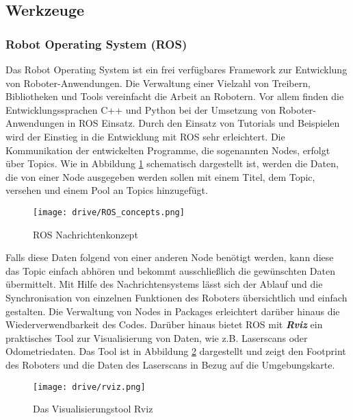 \subsection{Werkzeuge}

\subsubsection{Robot Operating System (ROS)}

Das Robot Operating System ist ein frei verfügbares Framework zur Entwicklung von Roboter-Anwendungen. Die Verwaltung einer Vielzahl von Treibern, Bibliotheken und Tools vereinfacht die Arbeit an Robotern. Vor allem finden die Entwicklungssprachen C++ und Python bei der Umsetzung von Roboter-Anwendungen in ROS Einsatz. Durch den Einsatz von Tutorials und Beispielen wird der Einstieg in die Entwicklung mit ROS sehr erleichtert. Die Kommunikation der entwickelten Programme, die sogenannten Nodes, erfolgt über Topics. Wie in Abbildung \ref{fig:ROS_concepts} schematisch dargestellt ist, werden die Daten, die von einer Node
ausgegeben werden sollen mit einem Titel, dem Topic, versehen und einem Pool an Topics hinzugefügt.

\begin{figure}[h!]
 \centering
		\texttt{[image: drive/ROS\_concepts.png]}
	\caption{ROS Nachrichtenkonzept}
	\label{fig:ROS_concepts}
\end{figure}

Falls diese Daten folgend von einer anderen Node benötigt werden, kann diese das Topic einfach abhören und bekommt ausschließlich die gewünschten Daten übermittelt. Mit Hilfe des Nachrichtensystems lässt sich der Ablauf und die Synchronisation von einzelnen Funktionen des Roboters übersichtlich und einfach gestalten. Die Verwaltung von Nodes in Packages erleichtert darüber hinaus die Wiederverwendbarkeit des Codes. Darüber hinaus bietet ROS mit \textbf{\textit{Rviz}} ein praktisches Tool zur Visualisierung von Daten, wie z.B. Laserscans oder Odometriedaten. Das Tool ist in Abbildung \ref{fig:Rviz} dargestellt und zeigt den Footprint des Roboters und die Daten des Laserscans in Bezug auf die Umgebungskarte.

\begin{figure}[h!]
 \centering
		\texttt{[image: drive/rviz.png]}
	\caption{Das Visualisierungstool Rviz}
	\label{fig:Rviz}
\end{figure}

\newpage

